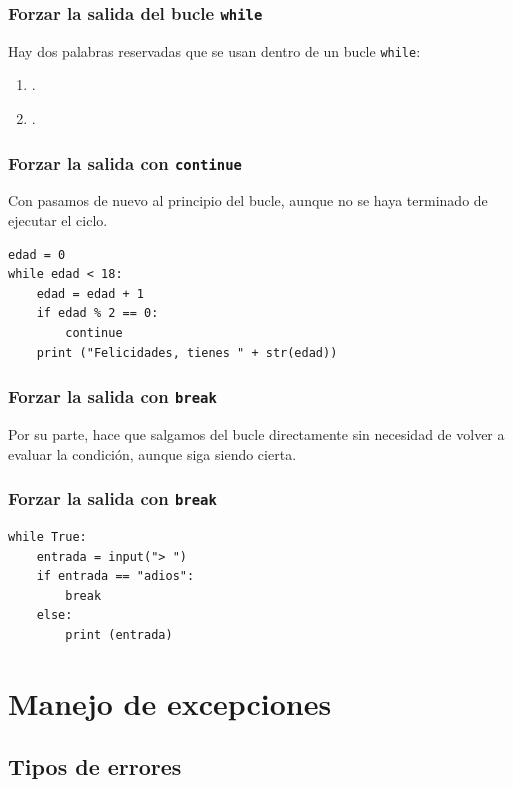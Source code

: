 \documentclass[12pt]{beamer}
\begin{document}
\begin{frame}[fragile]
\frametitle{Forzar la salida del bucle \texttt{while}}
Hay dos palabras reservadas que se usan dentro de un bucle \texttt{while}:
\pause
{}
\begin{enumerate}[<+->]
\item {}.
\item {}.
\end{enumerate}
\end{frame}
\begin{frame}[fragile]
\frametitle{Forzar la salida con \texttt{continue}}
Con  pasamos de nuevo al principio del bucle, aunque no se haya terminado de ejecutar el ciclo.
\begin{lstlisting}
edad = 0
while edad < 18:
    edad = edad + 1
    if edad % 2 == 0:
        continue
    print ("Felicidades, tienes " + str(edad))
\end{lstlisting}
\end{frame}
\begin{frame}[fragile]
\frametitle{Forzar la salida con \texttt{break}}
Por su parte,  hace que salgamos del bucle  directamente sin necesidad de volver a evaluar la condición, aunque siga siendo cierta.
\end{frame}
\begin{frame}[fragile]
\frametitle{Forzar la salida con \texttt{break}}
\begin{lstlisting}[caption=Forzando la salida del bucle con break]
while True:
    entrada = input("> ")
    if entrada == "adios":
        break
    else:
        print (entrada)
\end{lstlisting}
\end{frame}

\section{Manejo de excepciones}
\subsection{Tipos de errores}
\end{document}
